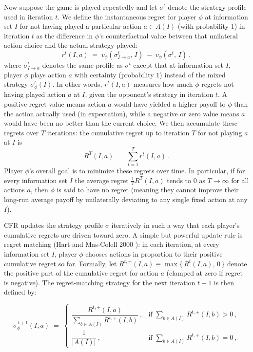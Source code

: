 \documentclass{article}
\begin{document}
Now suppose the game is played repeatedly and let $\sigma^t$ denote the strategy profile used in iteration $t$. We define the instantaneous regret for player $\phi$ at information set $I$ for not having played a particular action $a \in A(I)$ (with probability 1) in iteration $t$ as the difference in $\phi$’s counterfactual value between that unilateral action choice and the actual strategy played: 
\[
r^t(I,a) \;=\; v_{\phi}(\sigma^t_{I \to a},\, I)\;-\;v_{\phi}(\sigma^t,\, I)~,
\] 
where $\sigma^t_{I \to a}$ denotes the same profile as $\sigma^t$ except that at information set $I$, player $\phi$ plays action $a$ with certainty (probability $1$) instead of the mixed strategy $\sigma^t_\phi(I)$. In other words, $r^t(I,a)$ measures how much $\phi$ regrets not having played action $a$ at $I$, given the opponent’s strategy in iteration $t$. A positive regret value means action $a$ would have yielded a higher payoff to $\phi$ than the action actually used (in expectation), while a negative or zero value means $a$ would have been no better than the current choice. We then accumulate these regrets over $T$ iterations: the cumulative regret up to iteration $T$ for not playing $a$ at $I$ is 
\[ 
R^T(I,a) \;=\; \sum_{t=1}^{T} r^t(I,a)~. 
\] 
Player $\phi$’s overall goal is to minimize these regrets over time. In particular, if for every information set $I$ the average regret $\frac{1}{T}R^T(I,a)$ tends to $0$ as $T\to\infty$ for all actions $a$, then $\phi$ is said to have no regret (meaning they cannot improve their long-run average payoff by unilaterally deviating to any single fixed action at any $I$).

CFR updates the strategy profile $\sigma$ iteratively in such a way that each player’s cumulative regrets are driven toward zero. A simple but powerful update rule is regret matching (Hart and Mas-Colell 2000 \cite{hartmascolell}): in each iteration, at every information set $I$, player $\phi$ chooses actions in proportion to their positive cumulative regret so far. Formally, let $R^{t,+}(I,a) \equiv \max\{\,R^t(I,a),\,0\,\}$ denote the positive part of the cumulative regret for action $a$ (clamped at zero if regret is negative). The regret-matching strategy for the next iteration $t\!+\!1$ is then defined by: 

\begin{equation}\label{eq:regret-matching}
\sigma_{\phi}^{\,t+1}(I,a) \;=\; 
\begin{cases}
\dfrac{R^{t,+}(I,a)}{\sum_{b \in A(I)} R^{t,+}(I,b)}~, & \text{if }\sum_{b \in A(I)}R^{t,+}(I,b) > 0~, \\[2ex]
\dfrac{1}{\lvert A(I)\rvert}~, & \text{if }\sum_{b \in A(I)}R^{t,+}(I,b) = 0~,
\end{cases}
\end{equation}
\end{document}
